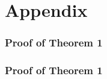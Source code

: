 \section{Appendix}
\subsubsection{Proof of Theorem 1}
\lipsum[1-2]

\subsubsection{Proof of Theorem 1}
\lipsum[1-2]